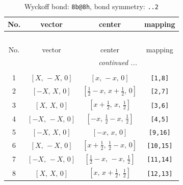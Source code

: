 \documentclass[fleqn,8pt]{jsarticle}
\begin{document}
\begin{longtable}{cccc}
\caption{Wyckoff bond: {\tt 8b@8h}, bond symmetry: {\tt ..2}}
 \\
 \hline \hline
No. & vector & center & mapping \\ \hline \endfirsthead

\multicolumn{3}{l}{\tablename\ \thetable{}} \\
 \hline \hline
No. & vector & center & mapping \\ \hline \endhead

 \hline \hline
\multicolumn{3}{r}{\footnotesize\it continued ...} \\ \endfoot

 \hline \hline
\multicolumn{3}{r}{} \\ \endlastfoot

1 & $\left[ X,\, - X,\, 0 \right]$ & $\left[ x,\, - x,\, 0 \right]$ & {\tt [1,8]} \\ \hline
2 & $\left[ - X,\, X,\, 0 \right]$ & $\left[ \frac{1}{2} - x,\, x + \frac{1}{2},\, 0 \right]$ & {\tt [2,7]} \\ \hline
3 & $\left[ X,\, X,\, 0 \right]$ & $\left[ x + \frac{1}{2},\, x,\, \frac{1}{2} \right]$ & {\tt [3,6]} \\ \hline
4 & $\left[ - X,\, - X,\, 0 \right]$ & $\left[ - x,\, \frac{1}{2} - x,\, \frac{1}{2} \right]$ & {\tt [4,5]} \\ \hline
5 & $\left[ - X,\, X,\, 0 \right]$ & $\left[ - x,\, x,\, 0 \right]$ & {\tt [9,16]} \\ \hline
6 & $\left[ X,\, - X,\, 0 \right]$ & $\left[ x + \frac{1}{2},\, \frac{1}{2} - x,\, 0 \right]$ & {\tt [10,15]} \\ \hline
7 & $\left[ - X,\, - X,\, 0 \right]$ & $\left[ \frac{1}{2} - x,\, - x,\, \frac{1}{2} \right]$ & {\tt [11,14]} \\ \hline
8 & $\left[ X,\, X,\, 0 \right]$ & $\left[ x,\, x + \frac{1}{2},\, \frac{1}{2} \right]$ & {\tt [12,13]} \\
\end{longtable}
\renewcommand{\arraystretch}{1.2}
\end{document}
